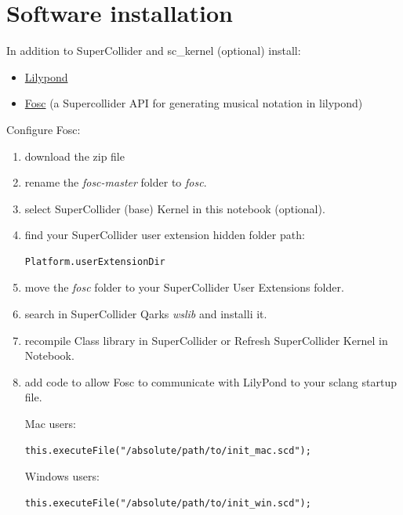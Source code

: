\section{Software installation}\label{software-installation}

In addition to SuperCollider and sc\_kernel (optional) install: 

\begin{itemize}
\tightlist
\item \href{https://lilypond.org/}{Lilypond} 
\item \href{https://github.com/n-armstrong/fosc}{Fosc} (a Supercollider API for generating musical notation in lilypond)
\end{itemize}

Configure Fosc:

\begin{enumerate}
\def\labelenumi{\arabic{enumi}.}
\tightlist
\item download the zip file
\item rename the \textit{fosc-master} folder to \textit{fosc}.
\item select SuperCollider (base) Kernel in this notebook (optional).
\item find your SuperCollider user extension hidden folder path:

\begin{lstlisting}[frame=single] 
Platform.userExtensionDir
\end{lstlisting}

\item move the \textit{fosc} folder to your SuperCollider User Extensions folder.
\item search in SuperCollider Qarks \textit{wslib} and installi it.
\item recompile Class library in SuperCollider or Refresh SuperCollider Kernel in Notebook.
\item add code to allow Fosc to communicate with LilyPond to your sclang startup file.

\pagebreak

Mac users:

\begin{lstlisting}[frame=single] 
this.executeFile("/absolute/path/to/init_mac.scd");
\end{lstlisting}

Windows users:

\begin{lstlisting}[frame=single] 
this.executeFile("/absolute/path/to/init_win.scd");
\end{lstlisting}


\end{enumerate}
